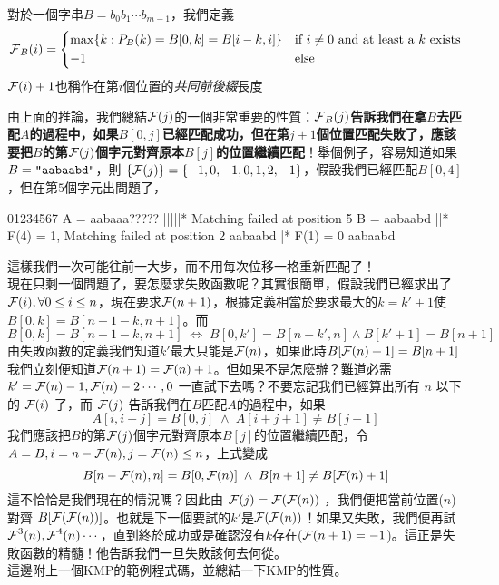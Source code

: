 \documentclass[a4paper,12pt]{book}
\begin{document}
\begin{theorem}
  對於一個字串$B = b_0 b_1 \cdots b_{m-1}$，我們定義
  \[
    \operatorname{\mathcal{F}}_B(i) = 
    \begin{dcases}
      \max \{ k: P_B(k) = B[0, k] = B[i-k, i] \} & \text{if } i \neq 0 \text{ and at least a $k$ exists}\\
      -1 & \text{else}\\
    \end{dcases}
  \]
  $\operatorname{\mathcal{F}}(i)+1$也稱作在第$i$個位置的\emph{共同前後綴}長度
\end{theorem}

由上面的推論，我們總結$\operatorname{\mathcal{F}}(j)$的一個非常重要的性質：{\bf $\operatorname{\mathcal{F}}_{B}(j)$告訴我們在拿$B$去匹配$A$的過程中，如果$B[0, j]$已經匹配成功，但在第$j+1$個位置匹配失敗了，應該要把$B$的第$\operatorname{\mathcal{F}}(j)$個字元對齊原本$B[j]$的位置繼續匹配}！舉個例子，容易知道如果$B = \texttt{"aabaabd"}$，則 $ \{\operatorname{\mathcal{F}}(j)\} = \{-1, 0, -1, 0, 1, 2, -1\}$，假設我們已經匹配$B[0,4]$，但在第$5$個字元出問題了，
\begin{monobox}
01234567
A = aabaaa?????
    |||||*        Matching failed at position 5
B = aabaabd         
       ||*        F(4) = 1, Matching failed at position 2
       aabaabd
        |*        F(1) = 0
        aabaabd
\end{monobox}
這樣我們一次可能往前一大步，而不用每次位移一格重新匹配了！\\
現在只剩一個問題了，要怎麼求失敗函數呢？其實很簡單，假設我們已經求出了\\
$\operatorname{\mathcal{F}}(i), \forall 0 \leq i \leq n$，現在要求$\operatorname{\mathcal{F}}(n+1)$，根據定義相當於要求最大的$k = k'+1$使$B[0, k] = B[n+1-k, n+1]$。而
\[
  B[0, k] = B[n+1-k, n+1] \; \Leftrightarrow \; B[0, k'] = B[n-k', n] \land B[k'+1] = B[n+1]
\]
由失敗函數的定義我們知道$k'$最大只能是$\operatorname{\mathcal{F}}(n)$，如果此時$B[\operatorname{\mathcal{F}}(n)+1] = B[n+1]$我們立刻便知道$\operatorname{\mathcal{F}}(n+1) = \operatorname{\mathcal{F}}(n) + 1$。但如果不是怎麼辦？難道必需 $k' = \operatorname{\mathcal{F}}(n)-1 , \operatorname{\mathcal{F}}(n)-2\cdots, 0$ 一直試下去嗎？不要忘記我們已經算出所有 $n$ 以下的 $\operatorname{\mathcal{F}}(i)$ 了，而 $\operatorname{\mathcal{F}}(j)$ 告訴我們在$B$匹配$A$的過程中，如果
\[ A[i, i+j] = B[0, j] \; \land \; A[i+j+1] \neq B[j+1] \]
我們應該把$B$的第$\operatorname{\mathcal{F}}(j)$個字元對齊原本$B[j]$的位置繼續匹配，令$A = B, i = n - \operatorname{\mathcal{F}}(n), j = \operatorname{\mathcal{F}}(n) \leq n$，上式變成
\[ B[n - \operatorname{\mathcal{F}}(n), n] = B[0, \operatorname{\mathcal{F}}(n)] \; \land \; B[n+1] \neq B[\operatorname{\mathcal{F}}(n)+1] \]
這不恰恰是我們現在的情況嗎？因此由 $\operatorname{\mathcal{F}}(j) = \operatorname{\mathcal{F}}(\operatorname{\mathcal{F}}(n))$ ，我們便把當前位置($n$)對齊 $B[\operatorname{\mathcal{F}}(\operatorname{\mathcal{F}}(n))]$。也就是下一個要試的$k'$是$\operatorname{\mathcal{F}}(\operatorname{\mathcal{F}}(n))$！如果又失敗，我們便再試$\operatorname{\mathcal{F}}^3(n), \operatorname{\mathcal{F}}^4(n) \cdots$，直到終於成功或是確認沒有$k$存在($\operatorname{\mathcal{F}}(n+1) = -1$)。這正是失敗函數的精髓！他告訴我們一旦失敗該何去何從。\\
這邊附上一個KMP的範例程式碼，並總結一下KMP的性質。
\end{document}
